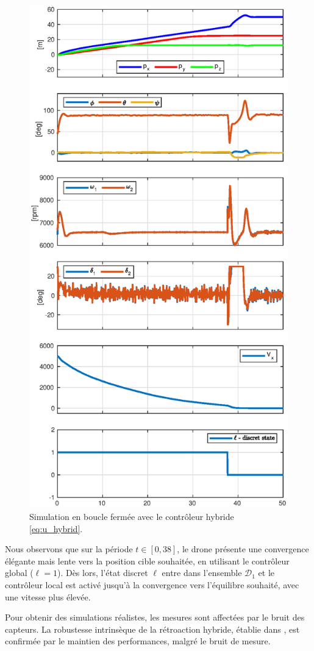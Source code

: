 \begin{figure}[H]
    \centering
    \includegraphics[trim=0cm 0cm 0cm 1.1cm,clip,width=0.7\columnwidth]{figures/switch_paper2.eps}
    \caption{Simulation en boucle fermée avec le contrôleur hybride \eqref{eq:u_hybrid}.}
    \label{fig_sim}
\end{figure}

Nous observons que sur la période $t \in \left[0,38\right]$, le drone
présente une convergence élégante mais lente vers la position cible souhaitée, en utilisant le contrôleur global ($\ell=1$). Dès lors, l'état discret $\ell$ entre dans l'ensemble $\mathcal{D}_1$ et le contrôleur local est activé jusqu'à la convergence vers l'équilibre souhaité, avec une vitesse plus élevée.

Pour obtenir des simulations réalistes, les mesures sont affectées par 
le bruit des capteurs. La robustesse intrinsèque de la rétroaction hybride, établie dans \cite[Chapitre 7]{65}, est confirmée par le maintien des performances, malgré le bruit de mesure.

